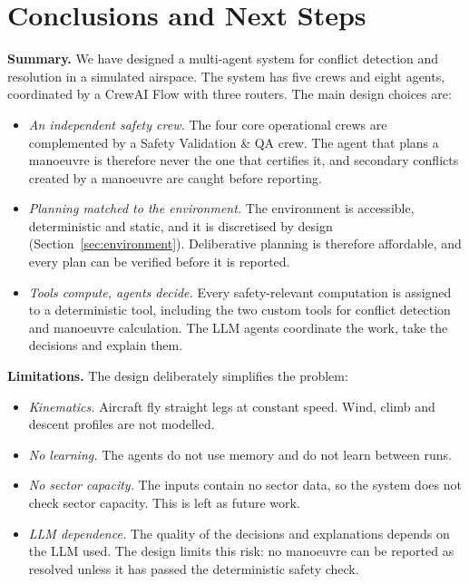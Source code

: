 \section{Conclusions and Next Steps}\label{sec:conclusions}

\textbf{Summary.} We have designed a multi-agent system for conflict detection and resolution in a simulated airspace. The system has five crews and eight agents, coordinated by a CrewAI Flow with three routers. The main design choices are:
\begin{itemize}
    \item \emph{An independent safety crew.} The four core operational crews are complemented by a Safety Validation \& QA crew. The agent that plans a manoeuvre is therefore never the one that certifies it, and secondary conflicts created by a manoeuvre are caught before reporting.
    \item \emph{Planning matched to the environment.} The environment is accessible, deterministic and static, and it is discretised by design (Section~\ref{sec:environment}). Deliberative planning is therefore affordable, and every plan can be verified before it is reported.
    \item \emph{Tools compute, agents decide.} Every safety-relevant computation is assigned to a deterministic tool, including the two custom tools for conflict detection and manoeuvre calculation. The LLM agents coordinate the work, take the decisions and explain them.
\end{itemize}

\textbf{Limitations.} The design deliberately simplifies the problem:
\begin{itemize}
    \item \emph{Kinematics.} Aircraft fly straight legs at constant speed. Wind, climb and descent profiles are not modelled.
    \item \emph{No learning.} The agents do not use memory and do not learn between runs.
    \item \emph{No sector capacity.} The inputs contain no sector data, so the system does not check sector capacity. This is left as future work.
    \item \emph{LLM dependence.} The quality of the decisions and explanations depends on the LLM used. The design limits this risk: no manoeuvre can be reported as resolved unless it has passed the deterministic safety check.
\end{itemize}

